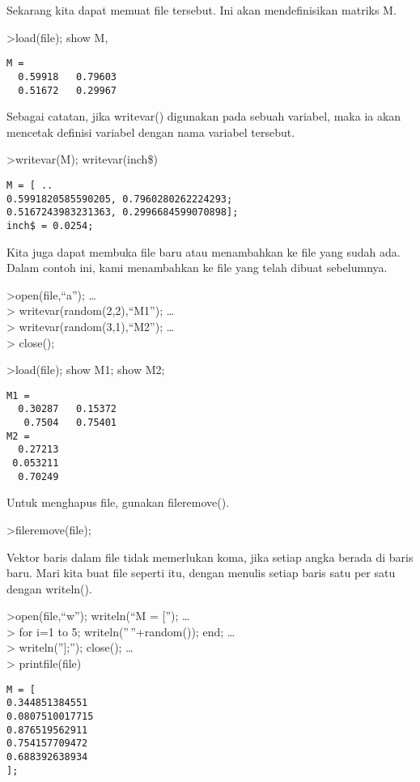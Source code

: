 \documentclass[
]{book}
\begin{document}
Sekarang kita dapat memuat file tersebut. Ini akan mendefinisikan matriks M.

\textgreater load(file); show M,

\begin{verbatim}
M = 
  0.59918   0.79603 
  0.51672   0.29967 
\end{verbatim}

Sebagai catatan, jika writevar() digunakan pada sebuah variabel, maka ia akan mencetak definisi variabel dengan nama variabel tersebut.

\textgreater writevar(M); writevar(inch\$)

\begin{verbatim}
M = [ ..
0.5991820585590205, 0.7960280262224293;
0.5167243983231363, 0.2996684599070898];
inch$ = 0.0254;
\end{verbatim}

Kita juga dapat membuka file baru atau menambahkan ke file yang sudah ada. Dalam contoh ini, kami menambahkan ke file yang telah dibuat sebelumnya.

\textgreater open(file,``a''); \ldots{}\\
\textgreater{} writevar(random(2,2),``M1''); \ldots{}\\
\textgreater{} writevar(random(3,1),``M2''); \ldots{}\\
\textgreater{} close();

\textgreater load(file); show M1; show M2;

\begin{verbatim}
M1 = 
  0.30287   0.15372 
   0.7504   0.75401 
M2 = 
  0.27213 
 0.053211 
  0.70249 
\end{verbatim}

Untuk menghapus file, gunakan fileremove().

\textgreater fileremove(file);

Vektor baris dalam file tidak memerlukan koma, jika setiap angka berada di baris baru. Mari kita buat file seperti itu, dengan menulis setiap baris satu per satu dengan writeln().

\textgreater open(file,``w''); writeln(``M = {[}''); \ldots{}\\
\textgreater{} for i=1 to 5; writeln(''\,''+random()); end; \ldots{}\\
\textgreater{} writeln(''{]};''); close(); \ldots{}\\
\textgreater{} printfile(file)

\begin{verbatim}
M = [
0.344851384551
0.0807510017715
0.876519562911
0.754157709472
0.688392638934
];
\end{verbatim}
\end{document}
